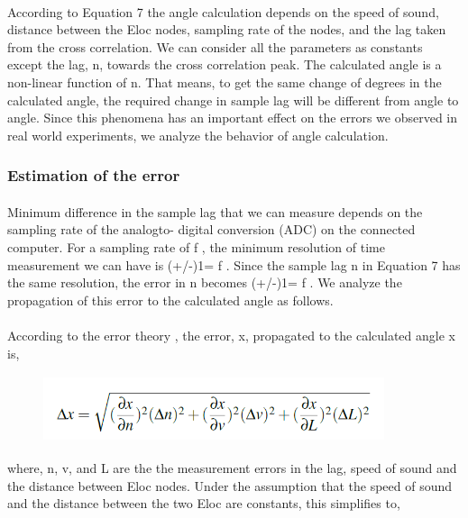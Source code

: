\documentclass[12pt]{article}
\numberwithin{figure}{section}
\numberwithin{table}{section}
\begin{document}
\paragraph{}
According to Equation 7 the angle calculation depends on the speed of sound, distance between the Eloc nodes, sampling
rate of the nodes, and the lag taken from the cross correlation. We can consider all the parameters as constants
except the lag, n, towards the cross correlation peak. The calculated angle is a non-linear function of n. That means, to
get the same change of degrees in the calculated angle, the required change in sample lag will be different from angle to
angle. Since this phenomena has an important effect on the errors we observed in real world experiments, we analyze the
behavior of angle calculation.

\subsubsection{Estimation of the error}

\paragraph{}
Minimum difference in the sample lag that we can measure depends on the sampling rate of the analogto-
digital conversion (ADC) on the connected computer. For a sampling rate of f , the minimum resolution of time measurement
we can have is (+/-)1= f . Since the sample lag n in Equation 7 has the same resolution, the error in n becomes
(+/-)1= f . We analyze the propagation of this error to the calculated angle as follows.

\paragraph{}
According to the error theory \cite{35}, the error, \Delta x, propagated to the calculated angle x is,

\begin{figure}[H]
\centering
\includegraphics[width=100mm,height=20mm]{error.png}
\end{figure}

where, \Delta n, \Delta v, and \Delta L are the the measurement errors in the lag, speed of sound and the distance between Eloc nodes. Under the assumption that the speed of sound and the distance between the two Eloc are constants, this simplifies to,
\end{document}
